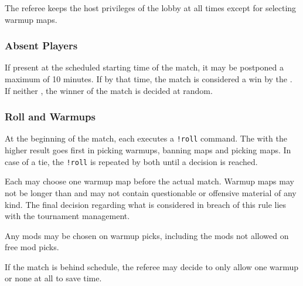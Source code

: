 The referee keeps the host privileges of the lobby at all times except for selecting warmup maps.

\subsubsection{Absent Players}
If  present at the scheduled starting time of the match, it may be postponed a maximum of 10 minutes.
If  by that time, the match is considered a win by the .
If neither , the winner of the match is decided at random.

\subsubsection{Roll and Warmups}
\label{sec:warmup}
At the beginning of the match, each  executes a \texttt{!roll} command. The  with the higher result goes first in picking warmups, banning maps and picking maps. In case of a tie, the \texttt{!roll} is repeated by both  until a decision is reached.

Each  may choose one warmup map before the actual match. Warmup maps may not be longer than \maxwarmup{} and may not contain questionable or offensive material of any kind. The final decision regarding what is considered in breach of this rule lies with the tournament management.

Any mods may be chosen on warmup picks, including the mods not allowed on free mod picks.

If the match is behind schedule, the referee may decide to only allow one warmup or none at all to save time.



